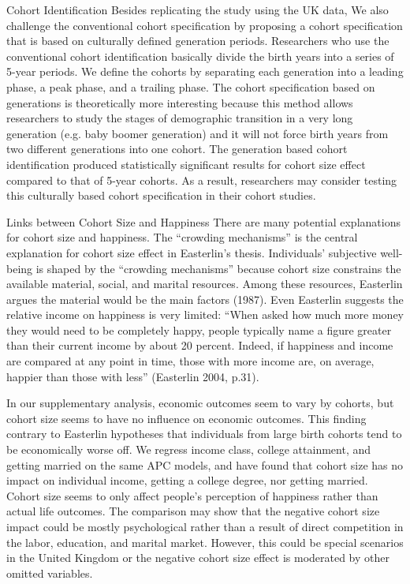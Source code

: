 Cohort Identification
Besides replicating the study using the UK data, We also challenge the conventional cohort specification by proposing a cohort specification that is based on culturally defined generation periods. Researchers who use the conventional cohort identification basically divide the birth years into a series of 5-year periods. We define the cohorts by separating each generation into a leading phase, a peak phase, and a trailing phase. The cohort specification based on generations is theoretically more interesting because this method allows researchers to study the stages of demographic transition in a very long generation (e.g. baby boomer generation) and it will not force birth years from two different generations into one cohort. The generation based cohort identification produced statistically significant results for cohort size effect compared to that of 5-year cohorts. As a result, researchers may consider testing this culturally based cohort specification in their cohort studies.

Links between Cohort Size and Happiness
There are many potential explanations for cohort size and happiness. The “crowding mechanisms” is the central explanation for cohort size effect in Easterlin’s thesis. Individuals’ subjective well-being is shaped by the “crowding mechanisms” because cohort size constrains the available material, social, and marital resources. Among these resources, Easterlin argues the material would be the main factors (1987). Even Easterlin suggests the relative income on happiness is very limited: “When asked how much more money they would need to be completely happy, people typically name a figure greater than their current income by about 20 percent. Indeed, if happiness and income are compared at any point in time, those with more income are, on average, happier than those with less” (Easterlin 2004, p.31). 

In our supplementary analysis, economic outcomes seem to vary by cohorts, but cohort size seems to have no influence on economic outcomes. This finding contrary to Easterlin hypotheses that individuals from large birth cohorts tend to be economically worse off. We regress income class, college attainment, and getting married on the same APC models, and have found that cohort size has no impact on individual income, getting a college degree, nor getting married. Cohort size seems to only affect people’s perception of happiness rather than actual life outcomes. The comparison may show that the negative cohort size impact could be mostly psychological rather than a result of direct competition in the labor, education, and marital market. However, this could be special scenarios in the United Kingdom or the negative cohort size effect is moderated by other omitted variables.

